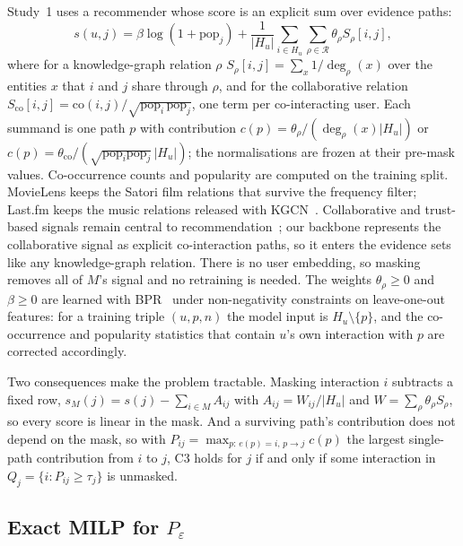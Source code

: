 \documentclass[11pt]{article}
\newcommand{\Peps}{P_\varepsilon}
\begin{document}
Study~1 uses a recommender whose score is an explicit sum over evidence paths:
\begin{equation}
s(u,j)=\beta\log(1+\mathrm{pop}_j)+\frac{1}{|H_u|}\sum_{i\in H_u}\sum_{\rho\in\mathcal{R}}\theta_\rho S_\rho[i,j],
\label{eq:backbone}
\end{equation}
where for a knowledge-graph relation $\rho$
$S_\rho[i,j]=\sum_{x}1/\deg_\rho(x)$ over the entities $x$ that $i$ and $j$ share through $\rho$, and for the
collaborative relation $S_{\mathrm{co}}[i,j]=\mathrm{co}(i,j)/\sqrt{\mathrm{pop}_i\,\mathrm{pop}_j}$, one term per
co-interacting user. Each summand is one path $p$ with contribution
$c(p)=\theta_\rho/(\deg_\rho(x)|H_u|)$ or $c(p)=\theta_{\mathrm{co}}/(\sqrt{\mathrm{pop}_i\mathrm{pop}_j}\,|H_u|)$;
the normalisations are frozen at their pre-mask values. Co-occurrence counts and popularity are computed on the
training split. MovieLens keeps the \MLKGRel{} Satori film relations that survive the frequency filter; Last.fm keeps
the \LFKGRel{} music relations released with KGCN~\cite{wang2019kgcn}. Collaborative and trust-based signals remain central to recommendation~\cite{faridani2017trust}; our
backbone represents the collaborative signal as explicit co-interaction paths, so it enters the evidence sets like
any knowledge-graph relation. There is no user embedding, so masking removes all of $M$'s signal and no retraining is needed. The
weights $\theta_\rho\ge0$ and $\beta\ge0$ are learned with BPR~\cite{rendle2009bpr} under non-negativity constraints
on leave-one-out features: for a training triple $(u,p,n)$ the model input is $H_u\setminus\{p\}$, and the
co-occurrence and popularity statistics that contain $u$'s own interaction with $p$ are corrected accordingly.

Two consequences make the problem tractable. Masking interaction $i$ subtracts a fixed row,
$s_M(j)=s(j)-\sum_{i\in M}A_{ij}$ with $A_{ij}=W_{ij}/|H_u|$ and $W=\sum_\rho\theta_\rho S_\rho$, so every score is
linear in the mask. And a surviving path's contribution does not depend on the mask, so with
$P_{ij}=\max_{p:\,e(p)=i,\,p\to j}c(p)$ the largest single-path contribution from $i$ to $j$, C3 holds for $j$ if and
only if some interaction in $Q_j=\{i:P_{ij}\ge\tau_j\}$ is unmasked.

\subsection{Exact MILP for \texorpdfstring{$\Peps$}{P-epsilon}}
\end{document}
